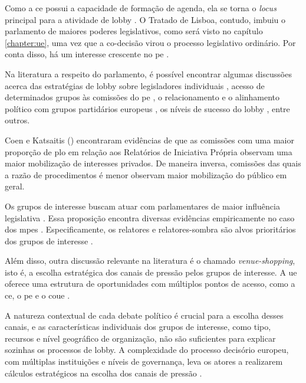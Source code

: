     Como a \acrshort{ce} possui a capacidade de formação de agenda, ela se torna o \textit{locus} principal para a atividade de lobby \cite{cram2001whither, pollack_delegation_2002}. O Tratado de Lisboa, contudo, imbuiu o parlamento de maiores poderes legislativos, como será visto no capítulo \ref{chapter:ue}, uma vez que a co-decisão virou o processo legislativo ordinário. Por conta disso, há um interesse crescente no \acrshort{pe} \cite{hix2013empowerment, Dionigi2017}.
    
    Na literatura a respeito do parlamento, é possível encontrar algumas discussões acerca das estratégias de lobby sobre legisladores individuais \cite{marshall2015explaining}, acesso de determinados grupos às comissões do \acrshort{pe} \cite{marshall2010lobby}, o relacionamento e o alinhamento político com grupos partidários europeus \cite{beyers2015alignment}, os níveis de sucesso do lobby \cite{Dionigi2017}, entre outros.

    Coen e Katsaitis (\citeyear{coen2019legislative}) encontraram evidências de que as comissões com uma maior proporção de \acrfull{plo} em relação aos Relatórios de Iniciativa Própria observam uma maior mobilização de interesses privados. De maneira inversa, comissões das quais a razão de procedimentos é menor observam maior mobilização do público em geral.

    Os grupos de interesse buscam atuar com parlamentares de maior influência legislativa \cite{marshall2010lobby}. Essa proposição encontra diversas evidências empiricamente no caso dos \acrshort{mpe}s \cite{kluver2015legislative, marshall2010lobby}. Especificamente, os relatores e relatores-sombra são alvos prioritários dos grupos de interesse \cite{kluver2015legislative}.

Além disso, outra discussão relevante na literatura é o chamado \textit{venue-shopping}, isto é, a escolha estratégica dos canais de pressão pelos grupos de interesse. A \acrshort{ue} oferece uma estrutura de oportunidades com múltiplos pontos de acesso, como a \acrshort{ce}, o \acrshort{pe} e o \acrfull{coue} \cite{richardson2000government}.

    A natureza contextual de cada debate político é crucial para a escolha desses canais, e as características individuais dos grupos de interesse, como tipo, recursos e nível geográfico de organização, não são suficientes para explicar sozinhas os processos de lobby. A complexidade do processo decisório europeu, com múltiplas instituições e níveis de governança, leva os atores a realizarem cálculos estratégicos na escolha dos canais de pressão \cite{kluver2015legislative}.

